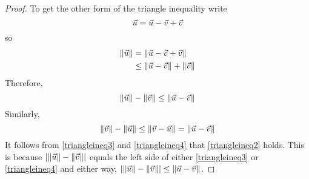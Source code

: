 \begin{proof}
To get the other form of the triangle inequality write 
\begin{equation*}
\vec{u}=\vec{u}-\vec{v}+\vec{v}
\end{equation*}
so
\begin{align*}
\| \vec{u}\| & =\| \vec{u}-\vec{v}+\vec{v}\| \\
& \leq \| \vec{u}-\vec{v}\| +\| \vec{v}\| 
\end{align*}
Therefore,
\begin{equation}
\| \vec{u}\| -\| \vec{v}\| \leq \| \vec{u}-\vec{v}
\|  \label{triangleineq3}
\end{equation}
Similarly,
\begin{equation}
\| \vec{v}\| -\| \vec{u}\| \leq \| \vec{v}-\vec{u}
\| =\| \vec{u}-\vec{v}\|  \label{triangleineq4}
\end{equation}
It follows from \ref{triangleineq3} and \ref{triangleineq4} that \ref{triangleineq2} holds. This
is because $\left| \| \vec{u}\| -\| \vec{v}\|
\right| $ equals the left side of either \ref{triangleineq3} or \ref{triangleineq4} and
either way, $\left| \| \vec{u}\| -\| \vec{v}\|
\right| \leq \| \vec{u}-\vec{v}\| $. 
\end{proof}
